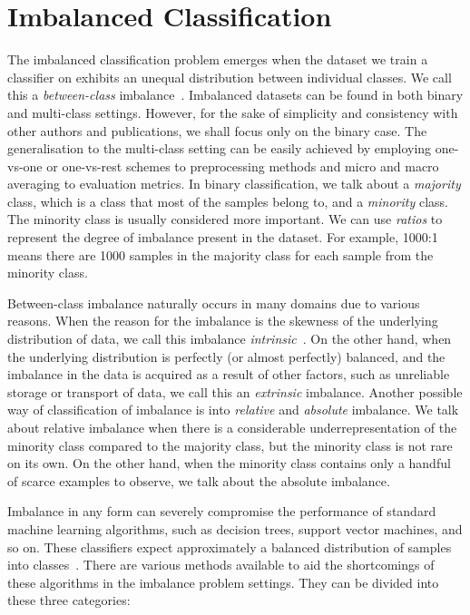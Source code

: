 \chapter{Imbalanced Classification}
\label{chapter:imb-classif}

The imbalanced classification problem emerges when the dataset we train a classifier on exhibits an
unequal distribution between individual classes. We call this a \emph{between-class}
imbalance~\cite{learning-from-imb-data}. Imbalanced datasets can be found in both binary and
multi-class settings. However, for the sake of simplicity and consistency with other authors and
publications, we shall focus only on the binary case. The generalisation to the multi-class setting
can be easily achieved by employing one-vs-one or one-vs-rest schemes to preprocessing methods and
micro and macro averaging to evaluation metrics. In binary classification, we talk about a
\emph{majority} class, which is a class that most of the samples belong to, and a \emph{minority}
class. The minority class is usually considered more important. We can use \emph{ratios} to
represent the degree of imbalance present in the dataset. For example, 1000:1 means there are 1000
samples in the majority class for each sample from the minority class.

Between-class imbalance naturally occurs in many domains due to various reasons. When the reason
for the imbalance is the skewness of the underlying distribution of data, we call this imbalance
\emph{intrinsic}~\cite{learning-from-imb-data}. On the other hand, when the underlying distribution
is perfectly (or almost perfectly) balanced, and the imbalance in the data is acquired as a result
of other factors, such as unreliable storage or transport of data, we call this an \emph{extrinsic}
imbalance. Another possible way of classification of imbalance is into \emph{relative} and
\emph{absolute} imbalance. We talk about relative imbalance when there is a considerable
underrepresentation of the minority class compared to the majority class, but the minority class is
not rare on its own. On the other hand, when the minority class contains only a handful of scarce
examples to observe, we talk about the absolute imbalance.

Imbalance in any form can severely compromise the performance of standard machine learning
algorithms, such as decision trees, support vector machines, and so on. These classifiers expect
approximately a balanced distribution of samples into classes~\cite{gosain2017}. There are various
methods available to aid the shortcomings of these algorithms in the imbalance problem settings.
They can be divided into these three categories:

